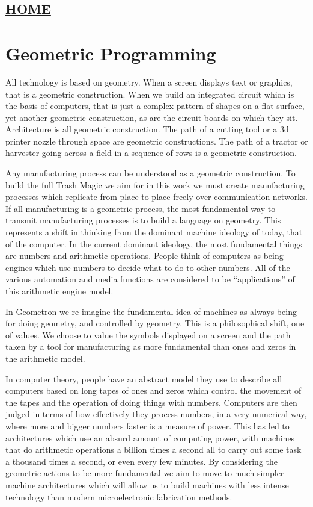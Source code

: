 \hypertarget{home}{%
\subsection{\texorpdfstring{\href{scrolls/home}{HOME}}{HOME}}\label{home}}

\hypertarget{geometric-programming}{%
\section{Geometric Programming}\label{geometric-programming}}

All technology is based on geometry. When a screen displays text or
graphics, that is a geometric construction. When we build an integrated
circuit which is the basis of computers, that is just a complex pattern
of shapes on a flat surface, yet another geometric construction, as are
the circuit boards on which they sit. Architecture is all geometric
construction. The path of a cutting tool or a 3d printer nozzle through
space are geometric constructions. The path of a tractor or harvester
going across a field in a sequence of rows is a geometric construction.

Any manufacturing process can be understood as a geometric construction.
To build the full Trash Magic we aim for in this work we must create
manufacturing processes which replicate from place to place freely over
communication networks. If all manufacturing is a geometric process, the
most fundamental way to transmit manufacturing processes is to build a
language on geometry. This represents a shift in thinking from the
dominant machine ideology of today, that of the computer. In the current
dominant ideology, the most fundamental things are numbers and
arithmetic operations. People think of computers as being engines which
use numbers to decide what to do to other numbers. All of the various
automation and media functions are considered to be ``applications'' of
this arithmetic engine model.

In Geometron we re-imagine the fundamental idea of machines as always
being for doing geometry, and controlled by geometry. This is a
philosophical shift, one of values. We choose to value the symbols
displayed on a screen and the path taken by a tool for manufacturing as
more fundamental than ones and zeros in the arithmetic model.

In computer theory, people have an abstract model they use to describe
all computers based on long tapes of ones and zeros which control the
movement of the tapes and the operation of doing things with numbers.
Computers are then judged in terms of how effectively they process
numbers, in a very numerical way, where more and bigger numbers faster
is a measure of power. This has led to architectures which use an absurd
amount of computing power, with machines that do arithmetic operations a
billion times a second all to carry out some task a thousand times a
second, or even every few minutes. By considering the geometric actions
to be more fundamental we aim to move to much simpler machine
architectures which will allow us to build machines with less intense
technology than modern microelectronic fabrication methods.

